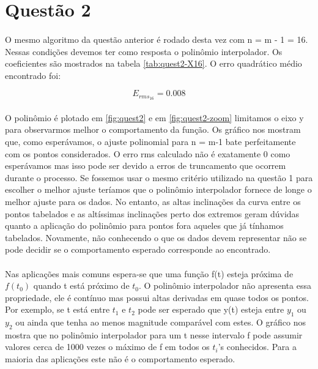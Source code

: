 \section*{Questão 2}

\paragraph{} O mesmo algoritmo da questão anterior é rodado
desta vez com n = m - 1 = 16. Nessas condições devemos ter como 
resposta o polinômio interpolador. Os coeficientes são mostrados
 na tabela \ref{tab:quest2-X16}.
O erro quadrático médio encontrado foi:

\begin{displaymath}
	E_{rms_{16}} = 0.008
\end{displaymath}

\paragraph{} O polinômio é plotado em \ref{fig:quest2} e em \ref{fig:quest2-zoom} 
limitamos o eixo y para observarmos melhor o comportamento da função.
Os gráfico nos mostram que, como esperávamos, o ajuste polinomial
para n = m-1 bate perfeitamente com os pontos considerados. O erro rms calculado
não é exatamente 0 como esperávamos mas isso pode ser devido a erros de truncamento
que ocorrem durante o processo. 
 Se fossemos usar o mesmo critério utilizado na
questão 1 
para escolher o melhor ajuste teríamos que o polinômio interpolador fornece de longe
o melhor ajuste para os dados. No entanto, as altas inclinações da curva entre
os pontos tabelados e as altíssimas inclinações perto
dos extremos geram dúvidas quanto a aplicação do polinômio para
pontos fora aqueles que já tínhamos tabelados. Novamente, não conhecendo o que os 
dados devem representar não se pode decidir se o comportamento esperado corresponde
ao encontrado.

\paragraph{}Nas aplicações mais comuns espera-se que uma função f(t) esteja próxima
de $f(t_0)$ quando t está próximo de $t_0$. O polinômio interpolador não apresenta 
essa propriedade, ele é contínuo mas possui altas derivadas em quase todos os pontos.
Por exemplo, se t está entre $t_1$ e $t_2$ pode ser esperado que y(t) esteja
entre $y_1$ ou $y_2$ ou ainda que tenha ao menos magnitude comparável com estes. 
O gráfico nos mostra que no polinômio interpolador para um t nesse intervalo f pode assumir
valores cerca de 1000 vezes o máximo de f em todos os $t_i$'s conhecidos. Para a maioria
das aplicações este não é o comportamento esperado. 

